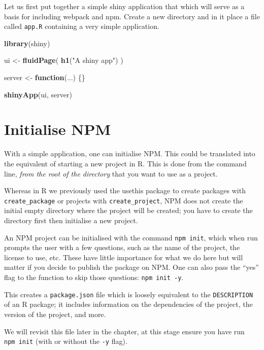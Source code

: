 \documentclass[10pt,]{krantz}
\makeatletter
\newenvironment{Shaded}{\begin{snugshade}}{\end{snugshade}}
\newcommand{\ControlFlowTok}[1]{\textcolor[rgb]{0.27,0.27,0.27}{\textbf{#1}}}
\newcommand{\KeywordTok}[1]{\textcolor[rgb]{0.27,0.27,0.27}{\textbf{#1}}}
\newcommand{\NormalTok}[1]{#1}
\newcommand{\StringTok}[1]{\textcolor[rgb]{0.5,0.5,0.5}{#1}}
\newenvironment{kframe}{%
\medskip{}
\setlength{\fboxsep}{.8em}
 \def\at@end@of@kframe{}%
 \ifinner\ifhmode%
  \def\at@end@of@kframe{\end{minipage}}%
  \begin{minipage}{\columnwidth}%
 \fi\fi%
 \def\FrameCommand##1{\hskip\@totalleftmargin \hskip-\fboxsep
 \colorbox{shadecolor}{##1}\hskip-\fboxsep
     \hskip-\linewidth \hskip-\@totalleftmargin \hskip\columnwidth}%
 \MakeFramed {\advance\hsize-\width
   \@totalleftmargin\z@ \linewidth\hsize
   \@setminipage}}%
 {\par\unskip\endMakeFramed%
 \at@end@of@kframe}
\renewenvironment{Shaded}{\begin{kframe}}{\end{kframe}}
\makeatother
\begin{document}
Let us first put together a simple shiny application that which will serve as a basis for including webpack and npm. Create a new directory and in it place a file called \texttt{app.R} containing a very simple application.

\begin{Shaded}
\begin{Highlighting}[]
\KeywordTok{library}\NormalTok{(shiny)}

\NormalTok{ui <-}\StringTok{ }\KeywordTok{fluidPage}\NormalTok{(}
  \KeywordTok{h1}\NormalTok{(}\StringTok{"A shiny app"}\NormalTok{)}
\NormalTok{)}

\NormalTok{server <-}\StringTok{ }\ControlFlowTok{function}\NormalTok{(...) \{\}}

\KeywordTok{shinyApp}\NormalTok{(ui, server)}
\end{Highlighting}
\end{Shaded}

\hypertarget{webpack-intro-init-npm}{%
\section{Initialise NPM}\label{webpack-intro-init-npm}}

With a simple application, one can initialise NPM. This could be translated into the equivalent of starting a new project in R. This is done from the command line, \emph{from the root of the directory} that you want to use as a project.

Whereas in R we previously used the usethis package to create packages with \texttt{create\_package} or projects with \texttt{create\_project}, NPM does not create the initial empty directory where the project will be created; you have to create the directory first then initialise a new project.

An NPM project can be initialised with the command \texttt{npm\ init}, which when run prompts the user with a few questions, such as the name of the project, the license to use, etc. These have little importance for what we do here but will matter if you decide to publish the package on NPM. One can also pass the ``yes'' flag to the function to skip those questions: \texttt{npm\ init\ -y}.

This creates a \texttt{package.json} file which is loosely equivalent to the \texttt{DESCRIPTION} of an R package; it includes information on the dependencies of the project, the version of the project, and more.

We will revisit this file later in the chapter, at this stage ensure you have run \texttt{npm\ init} (with or without the \texttt{-y} flag).
\end{document}
